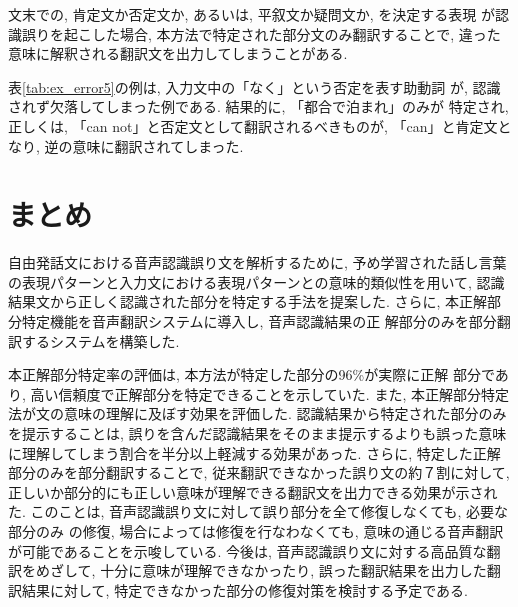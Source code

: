 文末での, 肯定文か否定文か, あるいは, 平叙文か疑問文か, を決定する表現
が認識誤りを起こした場合, 本方法で特定された部分文のみ翻訳することで, 
違った意味に解釈される翻訳文を出力してしまうことがある. 

表\ref{tab:ex_error5}の例は, 入力文中の「なく」という否定を表す助動詞
が, 認識されず欠落してしまった例である. 結果的に, 「都合で泊まれ」のみが
特定され, 正しくは, 「can not」と否定文として翻訳されるべきものが, 
「can」と肯定文となり, 逆の意味に翻訳されてしまった. 

\section{まとめ}

自由発話文における音声認識誤り文を解析するために, 予め学習された話し言葉の表現パターンと入力文における表現パターンとの意味的類似性を用いて, 認識結果文から正しく認識された部分を特定する手法を提案した. 
さらに, 本正解部分特定機能を音声翻訳システムに導入し, 音声認識結果の正
解部分のみを部分翻訳するシステムを構築した. 

本正解部分特定率の評価は, 本方法が特定した部分の96\%が実際に正解
部分であり, 高い信頼度で正解部分を特定できることを示していた. 
また, 本正解部分特定法が文の意味の理解に及ぼす効果を評価した. 認識結果から特定された部分のみを提示することは, 誤りを含んだ認識結果をそのまま提示するよりも誤った意味に理解してしまう割合を半分以上軽減する効果があった. 
さらに, 特定した正解部分のみを部分翻訳することで, 従来翻訳できなかった誤り文の約７割に対して, 正しいか部分的にも正しい意味が理解できる翻訳文を出力できる効果が示された. 
このことは, 音声認識誤り文に対して誤り部分を全て修復しなくても, 必要な部分のみ
の修復, 場合によっては修復を行なわなくても, 意味の通じる音声翻訳が可能であることを示唆している. 
今後は, 音声認識誤り文に対する高品質な翻訳をめざして, 十分に意味が理解できなかったり, 誤った翻訳結果を出力した翻訳結果に対して, 特定できなかった部分の修復対策を検討する予定である. 


